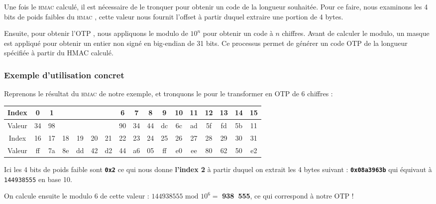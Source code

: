 \documentclass[a4paper, 10pt]{article}
\newcommand{\otp}{\textsc{OTP} }
\newcommand{\hmac}{\textsc{hmac} }
\begin{document}
Une fois le \textcolor{myblue}{\hmac calculé}, il est nécessaire de le \textcolor{myblue}{tronquer} pour obtenir un code de la longueur souhaitée.
Pour ce faire, nous examinons les \textcolor{mygreen}{4 bits de poids faibles} du \hmac, cette valeur nous \textcolor{mygreen}{fournit l'offset} à partir duquel \textcolor{mygreen}{extraire une portion de 4 bytes}.

Ensuite, pour obtenir l'\otp, nous appliquons le \textcolor{myblue}{modulo de \(10^n\)} pour \textcolor{mygreen}{obtenir un code à \(n\) chiffres}. Avant de calculer le modulo, un \textcolor{myblue}{masque} est appliqué pour obtenir un \textcolor{mygreen}{entier non signé} en big-endian de 31 bits.
Ce processus permet de générer un code \otp de la longueur spécifiée à partir du HMAC calculé.


        \subsubsection{Exemple d'utilisation concret}

Reprenons le résultat du \hmac de notre exemple, et tronquons le pour le transformer en \otp de 6 chiffres :

\begin{center}
\begin{tabular}{|c c c c c c c c c c c c c c c c c|}
\hline
Index & 0 & 1 & \color{red}{2} & \color{red}{3} & \color{red}{4} & \color{red}{5} & 6 & 7 & 8 & 9 & 10 & 11 & 12 & 13 & 14  & 15\\
\hline
Valeur & 34 & 98 & \color{green}{08} & \color{green}{a3} & \color{green}{96} & \color{green}{3b} & 90 & 34 & 44 & dc & 6c & ad & 5f & fd & 5b & 11\\
\hline 
\hline
Index  & 16 & 17 & 18 & 19 & 20 & 21 & 22 & 23 & 24 & 25 & 26 & 27 & 28 & 29 & 30 & 31\\
Valeur  & ff & 7a & 8e & dd & 42 & d2 & 44 & a6 & 05 & ff & e0 & ee & 80 & 62 & 50 & e2\\
\hline
\end{tabular}
\end{center}

\noindent

Ici les 4 bits de poids faible sont \textbf{\texttt{0x2}} ce qui nous donne \textbf{l'index 2} à partir duquel on extrait les 4 bytes suivant : \textbf{\texttt{0x08a3963b}} qui équivaut à \texttt{144938555} en base 10.

On calcule ensuite le modulo 6 de cette valeur : $ 144938555 \text{ mod } 10^6 = $ \textbf{938\ 555}, ce qui correspond à notre \otp !
\end{document}
